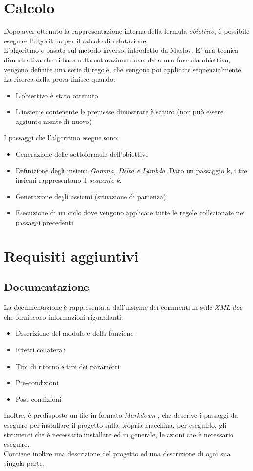 \documentclass[\main/tesi.tex]{subfiles}
\begin{document}
\section{Calcolo}
Dopo aver ottenuto la rappresentazione interna della formula \textit{obiettivo}, è possibile eseguire l'algoritmo per il calcolo di refutazione. \\
L'algoritmo è basato sul metodo inverso, introdotto da Maslov. E' una tecnica dimostrativa che si basa sulla saturazione dove, data una formula obiettivo, vengono definite una serie di regole, che vengono poi applicate sequenzialmente. \\
La ricerca della prova finisce quando:
\begin{itemize}
  \item L'obiettivo è stato ottenuto
  \item L'insieme contenente le premesse dimostrate è saturo (non può essere aggiunto niente di nuovo)
\end{itemize}
I passaggi che l'algoritmo esegue sono:
\begin{itemize}
  \item Generazione delle sottoformule dell'obiettivo
  \item Definizione degli insiemi \textit{Gamma, Delta e Lambda}. Dato un passaggio k, i tre insiemi rappresentano il \textit{sequente k}.
  \item Generazione degli assiomi (situazione di partenza)
  \item Esecuzione di un ciclo dove vengono applicate tutte le regole collezionate nei passaggi precedenti
\end{itemize}

\section{Requisiti aggiuntivi}

\subsection{Documentazione}
\label{documentation}
La documentazione è rappresentata dall'insieme dei commenti in stile \textit{XML doc} \cite{xml} che forniscono informazioni riguardanti:
\begin{itemize}
  \item Descrizione del modulo e della funzione
  \item Effetti collaterali
  \item Tipi di ritorno e tipi dei parametri
  \item Pre-condizioni
  \item Post-condizioni
\end{itemize}
Inoltre, è predisposto un file in formato \textit{Markdown} \cite{markdown}, che descrive i passaggi da eseguire per installare il progetto sulla propria macchina, per eseguirlo, gli strumenti che è necessario installare ed in generale, le azioni che è necessario eseguire. \\
Contiene inoltre una descrizione del progetto ed una descrizione di ogni sua singola parte. \\
\end{document}
